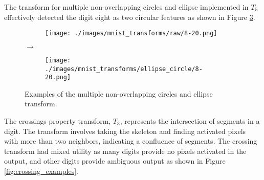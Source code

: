 The transform for multiple non-overlapping circles and ellipse implemented in
$T_5$ effectively detected the digit eight as two circular features as shown in
Figure \ref{fig:ellipse_circle_examples}.

\begin{figure}[H]
    \centering

    \begin{subfigure}{.15\columnwidth}
        \centering
        \texttt{[image: ./images/mnist\_transforms/raw/8-20.png]}
        \caption{}
        \label{fig:ellipse_circle_orig1}
    \end{subfigure}%
    $\rightarrow$
    \begin{subfigure}{.15\columnwidth}
        \centering
        \texttt{[image: ./images/mnist\_transforms/ellipse\_circle/8-20.png]}
        \caption{}
        \label{fig:ellipse_circle_transform1}
    \end{subfigure}

    \caption{Examples of the multiple non-overlapping circles and ellipse transform.}
    \label{fig:ellipse_circle_examples}
\end{figure}


The crossings property transform, $T_3$, represents the intersection of segments
in a digit. The transform involves taking the skeleton and finding activated
pixels with more than two neighbors, indicating a confluence of segments. The
crossing transform had mixed utility as many digits provide no pixels activated
in the output, and other digits provide ambiguous output as shown in Figure
\ref{fig:crossing_examples}.


